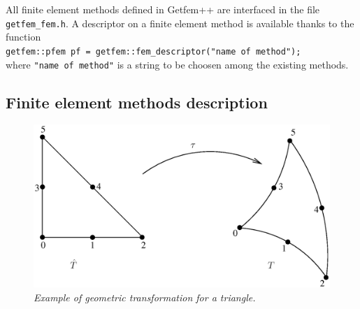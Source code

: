 \documentclass[10pt,a4paper]{article}
\begin{document}
All finite element methods defined in {\sc Getfem++} are interfaced in the file {\tt getfem\_fem.h}.
A descriptor on a finite element method is available thanks to the function\\[0.5cm]
{\tt getfem::pfem pf = getfem::fem\_descriptor("name of method");
}\\[0.5cm]
where {\tt "name of method"} is a string to be choosen among the existing methods.

\subsection{Finite element methods description}

\begin{figure}[H]
  \begin{center} 
    \includegraphics[width=12cm,angle=0]{getfemlist_extrans.eps}
    \caption{ \it Example of geometric transformation for a triangle.} \label{fig:extrans}
  \end{center}
\end{figure}
\end{document}
